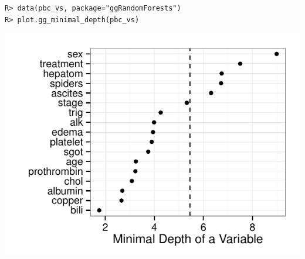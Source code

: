\documentclass[nojss]{jss}\usepackage[]{graphicx}\usepackage[]{color}
\makeatletter
\def\maxwidth{ %
  \ifdim\Gin@nat@width>\linewidth
    \linewidth
  \else
    \Gin@nat@width
  \fi
}
\newenvironment{kframe}{%
 \def\at@end@of@kframe{}%
 \ifinner\ifhmode%
  \def\at@end@of@kframe{\end{minipage}}%
  \begin{minipage}{\columnwidth}%
 \fi\fi%
 \def\FrameCommand##1{\hskip\@totalleftmargin \hskip-\fboxsep
 \colorbox{shadecolor}{##1}\hskip-\fboxsep
     \hskip-\linewidth \hskip-\@totalleftmargin \hskip\columnwidth}%
 \MakeFramed {\advance\hsize-\width
   \@totalleftmargin\z@ \linewidth\hsize
   \@setminipage}}%
 {\par\unskip\endMakeFramed%
 \at@end@of@kframe}
\newenvironment{knitrout}{}{} %
\makeatother
\begin{document}
\begin{knitrout}\footnotesize
{}\color{fgcolor}\begin{kframe}
\begin{verbatim}
R> data(pbc_vs, package="ggRandomForests")
R> plot.gg_minimal_depth(pbc_vs)
\end{verbatim}
\end{kframe}

{\centering \includegraphics[width=\maxwidth]{figure/vig-pbc-mindepth-1} 

}



\end{knitrout}
\end{document}
